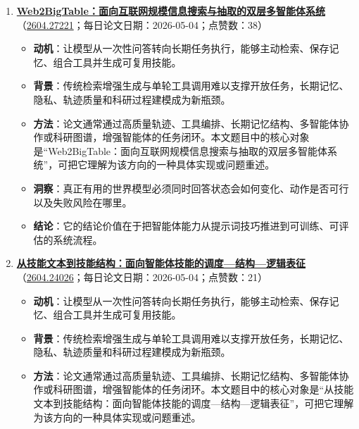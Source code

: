 \begin{enumerate}[leftmargin=1.5em]
\begin{itemize}[leftmargin=1.5em]
    \item \textbf{方法}：论文通常通过高质量轨迹、工具编排、长期记忆结构、多智能体协作或科研图谱，增强智能体的任务闭环。本文题目中的核心对象是“AcademiClaw：当学生为 AI 智能体设置挑战”，可把它理解为该方向的一种具体实现或问题重述。
    \item \textbf{洞察}：这篇工作的关键不在单点技巧，而在它把数据、模型、推理、奖励与评测中的某个环节重新组织进系统闭环。
    \item \textbf{结论}：它的结论价值在于把智能体能力从提示词技巧推进到可训练、可评估的系统流程。
  \end{itemize}
  \item \textbf{\href{https://huggingface.co/papers/2604.27221}{Web2BigTable：面向互联网规模信息搜索与抽取的双层多智能体系统}}（\href{https://arxiv.org/abs/2604.27221}{2604.27221}；每日论文日期：2026-05-04；点赞数：38）
  \begin{itemize}[leftmargin=1.5em]
    \item \textbf{动机}：让模型从一次性问答转向长期任务执行，能够主动检索、保存记忆、组合工具并生成可复用技能。
    \item \textbf{背景}：传统检索增强生成与单轮工具调用难以支撑开放任务，长期记忆、隐私、轨迹质量和科研过程建模成为新瓶颈。
    \item \textbf{方法}：论文通常通过高质量轨迹、工具编排、长期记忆结构、多智能体协作或科研图谱，增强智能体的任务闭环。本文题目中的核心对象是“Web2BigTable：面向互联网规模信息搜索与抽取的双层多智能体系统”，可把它理解为该方向的一种具体实现或问题重述。
    \item \textbf{洞察}：真正有用的世界模型必须同时回答状态会如何变化、动作是否可行以及失败风险在哪里。
    \item \textbf{结论}：它的结论价值在于把智能体能力从提示词技巧推进到可训练、可评估的系统流程。
  \end{itemize}
  \item \textbf{\href{https://huggingface.co/papers/2604.24026}{从技能文本到技能结构：面向智能体技能的调度—结构—逻辑表征}}（\href{https://arxiv.org/abs/2604.24026}{2604.24026}；每日论文日期：2026-05-04；点赞数：21）
  \begin{itemize}[leftmargin=1.5em]
    \item \textbf{动机}：让模型从一次性问答转向长期任务执行，能够主动检索、保存记忆、组合工具并生成可复用技能。
    \item \textbf{背景}：传统检索增强生成与单轮工具调用难以支撑开放任务，长期记忆、隐私、轨迹质量和科研过程建模成为新瓶颈。
    \item \textbf{方法}：论文通常通过高质量轨迹、工具编排、长期记忆结构、多智能体协作或科研图谱，增强智能体的任务闭环。本文题目中的核心对象是“从技能文本到技能结构：面向智能体技能的调度—结构—逻辑表征”，可把它理解为该方向的一种具体实现或问题重述。

\end{itemize}
\end{enumerate}

